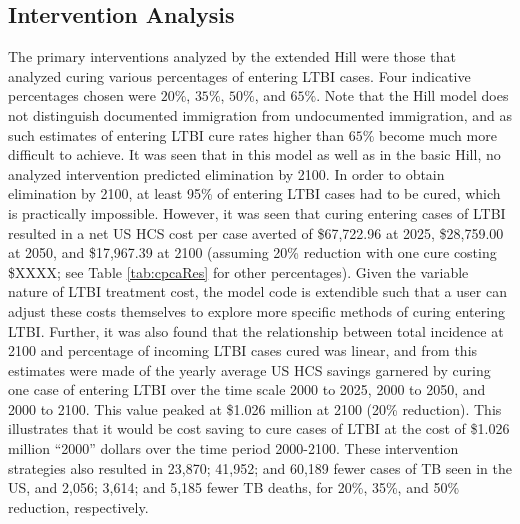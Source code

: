 \documentclass{amsart}
\begin{document}
\subsection{Intervention Analysis}
The primary interventions analyzed by the extended Hill were those that analyzed
curing various percentages of entering LTBI cases. Four indicative percentages
chosen were $20\%$, $35\%$, $50\%$, and $65\%$. Note that the Hill model does
not distinguish documented immigration from undocumented immigration, and as
such estimates of entering LTBI cure rates higher than $65\%$ become much more
difficult to achieve. It was seen that in this model as well as in the basic
Hill, no analyzed intervention predicted elimination by 2100. In order to obtain
elimination by 2100, at least 95\% of entering LTBI cases had to be cured, which
is practically impossible. However, it was seen that curing entering cases of
LTBI resulted in a net US HCS cost per case averted of \$67,722.96 at 2025, \$28,759.00 at 2050,
and \$17,967.39 at 2100 (assuming 20\% reduction with one cure costing \$XXXX; see Table
\ref{tab:cpcaRes} for other percentages). Given the variable nature of LTBI
treatment cost, the model code is extendible such that a user can adjust these
costs themselves to explore more specific methods of curing entering LTBI.
Further, it was also found that the relationship between total incidence at 2100
and percentage of incoming LTBI cases cured was linear, and from this estimates
were made of the yearly average US HCS savings garnered by curing one case of
entering LTBI over the time scale 2000 to 2025, 2000 to 2050, and 2000 to 2100.
This value peaked at \$1.026 million at 2100 (20\% reduction). This illustrates
that it would be cost saving to cure cases of LTBI at the cost of \$1.026
million ``2000'' dollars over the time period 2000-2100. These intervention
strategies also resulted in 23,870; 41,952; and 60,189 fewer cases of TB seen in
the US, and 2,056; 3,614; and 5,185 fewer TB deaths, for 20\%, 35\%, and 50\%
reduction, respectively.
\end{document}
